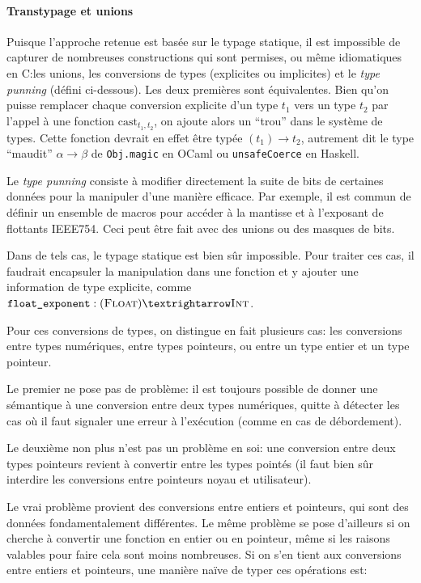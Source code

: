 \paragraph{Transtypage et unions}

Puisque l'approche retenue est basée sur le typage statique, il est impossible
de capturer de nombreuses constructions qui sont permises, ou même idiomatiques
en C:\@ les unions, les conversions de types (explicites ou implicites) et le
\emph{type punning} (défini ci-dessous). Les deux premières sont équivalentes.
Bien qu'on puisse remplacer chaque conversion explicite d'un type $t_1$ vers un
type $t_2$ par l'appel à une fonction $\mathrm{cast}_{t_1,t_2}$, on ajoute alors
un \enquote{trou} dans le système de types. Cette fonction devrait en effet être
typée $(t_1) → t_2$, autrement dit le type \enquote{maudit} $α → β$ de
\texttt{Obj.magic} en OCaml ou \texttt{unsafeCoerce} en Haskell.

Le \emph{type punning} consiste à modifier directement la suite de bits de
certaines données pour la manipuler d'une manière efficace. Par exemple, il est
commun de définir un ensemble de macros pour accéder à la mantisse et à
l'exposant de flottants IEEE754. Ceci peut être fait avec des unions ou des
masques de bits.

Dans de tels cas, le typage statique est bien sûr impossible. Pour traiter ces
cas, il faudrait encapsuler la manipulation dans une fonction et y ajouter une
information de type explicite, comme $\texttt{float\_exponent} : (\tFloat) →
\tInt$.

Pour ces conversions de types, on distingue en fait plusieurs cas: les
conversions entre types numériques, entre types pointeurs, ou entre un type
entier et un type pointeur.


Le premier ne pose pas de problème: il est toujours possible de donner une
sémantique à une conversion entre deux types numériques, quitte à détecter les
cas où il faut signaler une erreur à l'exécution (comme en cas de débordement).


Le deuxième non plus n'est pas un problème en soi: une conversion entre deux
types pointeurs revient à convertir entre les types pointés (il faut bien
sûr interdire les conversions entre pointeurs noyau et utilisateur).

Le vrai problème provient des conversions entre entiers et pointeurs, qui sont
des données fondamentalement différentes. Le même problème se pose d'ailleurs si
on cherche à convertir une fonction en entier ou en pointeur, même si les
raisons valables pour faire cela sont moins nombreuses.
Si on s'en tient aux conversions entre entiers et pointeurs, une manière naïve
de typer ces opérations est:

